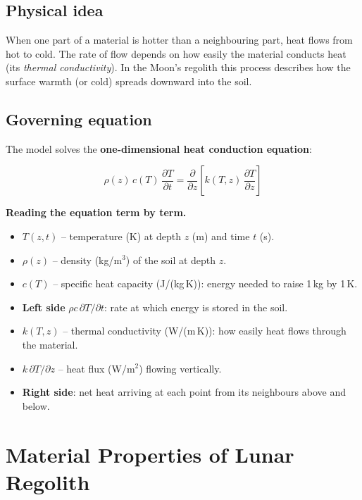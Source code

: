 \documentclass[12pt, a4paper]{article}
\begin{document}
\subsection{Physical idea}

When one part of a material is hotter than a neighbouring part,
heat flows from hot to cold.
The rate of flow depends on how easily the material conducts heat
(its \emph{thermal conductivity}).
In the Moon's regolith this process describes how the surface
warmth (or cold) spreads downward into the soil.

\subsection{Governing equation}

The model solves the \textbf{one-dimensional heat conduction
equation}:

\begin{equation}
  \rho(z)\,c(T)\,\frac{\partial T}{\partial t}
  =
  \frac{\partial}{\partial z}
  \!\left[k(T,z)\,\frac{\partial T}{\partial z}\right]
  \label{eq:heat_eq}
\end{equation}

\begin{eqbox}
  \textbf{Reading the equation term by term.}
  \begin{itemize}[leftmargin=1.2em, itemsep=3pt]
    \item $T(z,t)$ -- temperature (K) at depth $z$ (m) and
          time $t$ (s).
    \item $\rho(z)$ -- density (kg/m$^3$) of the soil at depth $z$.
    \item $c(T)$ -- specific heat capacity (J/(kg\,K)):
          energy needed to raise 1\,kg by 1\,K.
    \item \textbf{Left side} $\rho c\,\partial T/\partial t$:
          rate at which energy is stored in the soil.
    \item $k(T,z)$ -- thermal conductivity (W/(m\,K)):
          how easily heat flows through the material.
    \item $k\,\partial T/\partial z$ -- heat flux (W/m$^2$)
          flowing vertically.
    \item \textbf{Right side}: net heat arriving at each point
          from its neighbours above and below.
  \end{itemize}
\end{eqbox}

\section{Material Properties of Lunar Regolith}
\end{document}
